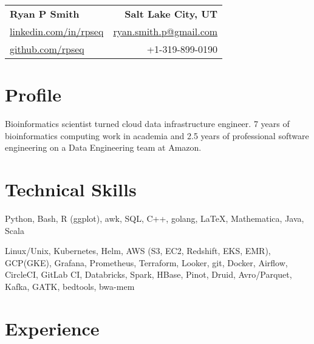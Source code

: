 
\RequirePackage{preamble}



\begin{tabular*}{\textwidth}{l@{\extracolsep{\fill}}r}
	\textbf{{\Large Ryan P Smith}} & \textbf{Salt Lake City, UT} \\
	\href{http://www.linkedin.com/in/rpseq}{linkedin.com/in/rpseq} &
	\href{mailto:ryan.smith.p@gmail.com}{ryan.smith.p@gmail.com} \\
	\href{https://github.com/RPSeq}{github.com/rpseq} & +1-319-899-0190 \\
\end{tabular*}

\section{Profile}

\small{Bioinformatics scientist turned cloud data infrastructure engineer. 7 years of bioinformatics computing work in academia and 2.5 years of professional software engineering on a Data Engineering team at Amazon.}


\section{Technical Skills}
\resumeSubHeadingListStart

{Python, Bash, R (ggplot), awk, SQL, C++, golang, \LaTeX, Mathematica, Java, Scala}

{Linux/Unix, Kubernetes, Helm, AWS (S3, EC2, Redshift, EKS, EMR), GCP(GKE), Grafana, Prometheus, Terraform, Looker, git, Docker, Airflow, CircleCI, GitLab CI, Databricks, Spark, HBase, Pinot, Druid, Avro/Parquet, Kafka, GATK, bedtools, bwa-mem}

\resumeSubHeadingListEnd

\section{Experience}
\resumeSubHeadingListStart

